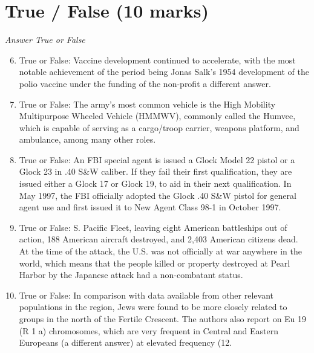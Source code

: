 \documentclass[12pt]{article}
\begin{document}
\section*{True / False (10 marks)}
\textit{Answer True or False}
\begin{enumerate}[label=\arabic*.]
\setcounter{enumi}{5}
\item True or False: Vaccine development continued to accelerate, with the most notable achievement of the period being Jonas Salk's 1954 development of the polio vaccine under the funding of the non-profit a different answer.
\item True or False: The army's most common vehicle is the High Mobility Multipurpose Wheeled Vehicle (HMMWV), commonly called the Humvee, which is capable of serving as a cargo/troop carrier, weapons platform, and ambulance, among many other roles.
\item True or False: An FBI special agent is issued a Glock Model 22 pistol or a Glock 23 in .40 S\&W caliber. If they fail their first qualification, they are issued either a Glock 17 or Glock 19, to aid in their next qualification. In May 1997, the FBI officially adopted the Glock .40 S\&W pistol for general agent use and first issued it to New Agent Class 98-1 in October 1997.
\item True or False: S. Pacific Fleet, leaving eight American battleships out of action, 188 American aircraft destroyed, and 2,403 American citizens dead. At the time of the attack, the U.S. was not officially at war anywhere in the world, which means that the people killed or property destroyed at Pearl Harbor by the Japanese attack had a non-combatant status.
\item True or False: In comparison with data available from other relevant populations in the region, Jews were found to be more closely related to groups in the north of the Fertile Crescent. The authors also report on Eu 19 (R 1 a) chromosomes, which are very frequent in Central and Eastern Europeans (a different answer) at elevated frequency (12.
\end{enumerate}
\end{document}
